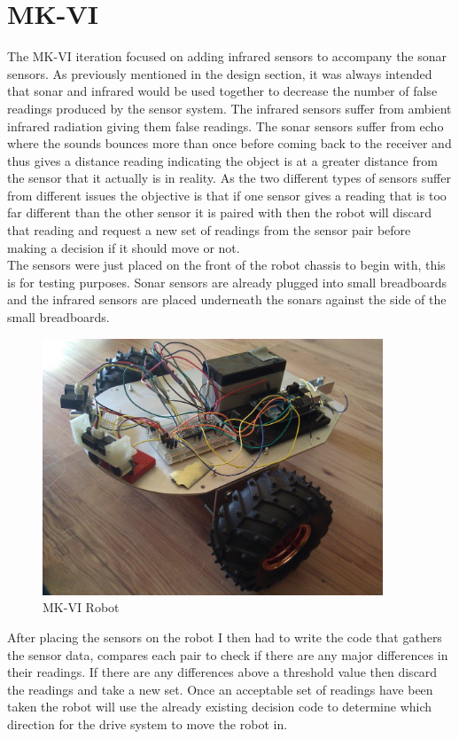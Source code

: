 \section{MK-VI}
The MK-VI iteration focused on adding infrared sensors to accompany the sonar sensors.  As previously mentioned in the design section, it was always intended that sonar and infrared would be used together to decrease the number of false readings produced by the sensor system.
The infrared sensors suffer from ambient infrared radiation giving them false readings.  The sonar sensors suffer from echo where the sounds bounces more than once before coming back to the receiver and thus gives a distance reading indicating the object is at a greater distance from the sensor that it actually is in reality.
As the two different types of sensors suffer from different issues the objective is that if one sensor gives a reading that is too far different than the other sensor it is paired with then the robot will discard that reading and request a new set of readings from the sensor pair before making a decision if it should move or not.
\\The sensors were just placed on the front of the robot chassis to begin with, this is for testing purposes.  Sonar sensors are already plugged into small breadboards and the infrared sensors are placed underneath the sonars against the side of the small breadboards.
\begin{figure}[H]
\centering
        \includegraphics[width=4.0in]  {Images/mk-vi.jpg}
        \caption{MK-VI Robot}
        \label{MK-VI Robot}
\end{figure}
After placing the sensors on the robot I then had to write the code that gathers the sensor data, compares each pair to check if there are any major differences in their readings.  If there are any differences above a threshold value then discard the readings and take a new set.  Once an acceptable set of readings have been taken the robot will use the already existing decision code to determine which direction for the drive system to move the robot in.
